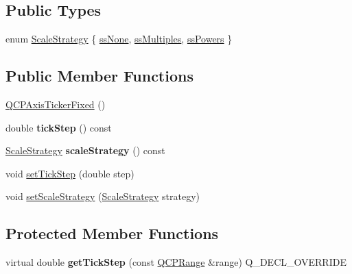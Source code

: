 \subsection*{Public Types}
\begin{DoxyCompactItemize}
\item 
enum \hyperlink{classQCPAxisTickerFixed_a15b3d38b935d404b1311eb85cfb6a439}{Scale\+Strategy} \{ \hyperlink{classQCPAxisTickerFixed_a15b3d38b935d404b1311eb85cfb6a439a6621275677a05caa0de204ae3956b85f}{ss\+None}, 
\hyperlink{classQCPAxisTickerFixed_a15b3d38b935d404b1311eb85cfb6a439a22f651785f6412645837421896561104}{ss\+Multiples}, 
\hyperlink{classQCPAxisTickerFixed_a15b3d38b935d404b1311eb85cfb6a439ac39d5813e9165ebd494307ae61ce5dce}{ss\+Powers}
 \}
\end{DoxyCompactItemize}
\subsection*{Public Member Functions}
\begin{DoxyCompactItemize}
\item 
\hyperlink{classQCPAxisTickerFixed_a96d2b053a15f9b8e94550c3efeff6a34}{Q\+C\+P\+Axis\+Ticker\+Fixed} ()
\item 
double {\bfseries tick\+Step} () const \hypertarget{classQCPAxisTickerFixed_a69e2dbe18a3fbc4108c7ea109fa5d3da}{}\label{classQCPAxisTickerFixed_a69e2dbe18a3fbc4108c7ea109fa5d3da}

\item 
\hyperlink{classQCPAxisTickerFixed_a15b3d38b935d404b1311eb85cfb6a439}{Scale\+Strategy} {\bfseries scale\+Strategy} () const \hypertarget{classQCPAxisTickerFixed_ab9cc237725db85b932dc6f3dd08b93fa}{}\label{classQCPAxisTickerFixed_ab9cc237725db85b932dc6f3dd08b93fa}

\item 
void \hyperlink{classQCPAxisTickerFixed_a4bc83d85a4f81d4abdd3fa5042d7b833}{set\+Tick\+Step} (double step)
\item 
void \hyperlink{classQCPAxisTickerFixed_acbc7c9bcd80b3dc3edee5f0519d301f6}{set\+Scale\+Strategy} (\hyperlink{classQCPAxisTickerFixed_a15b3d38b935d404b1311eb85cfb6a439}{Scale\+Strategy} strategy)
\end{DoxyCompactItemize}
\subsection*{Protected Member Functions}
\begin{DoxyCompactItemize}
\item 
virtual double {\bfseries get\+Tick\+Step} (const \hyperlink{classQCPRange}{Q\+C\+P\+Range} \&range) Q\+\_\+\+D\+E\+C\+L\+\_\+\+O\+V\+E\+R\+R\+I\+DE\hypertarget{classQCPAxisTickerFixed_a9e99da01ab92a86aed415eef32fed13a}{}\label{classQCPAxisTickerFixed_a9e99da01ab92a86aed415eef32fed13a}

\end{DoxyCompactItemize}
